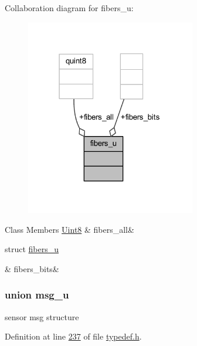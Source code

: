 Collaboration diagram for fibers\+\_\+u\+:
\nopagebreak
\begin{figure}[H]
\begin{center}
\leavevmode
\includegraphics[width=210pt]{d4/d08/a00237}
\end{center}
\end{figure}
\begin{DoxyFields}{Class Members}
\hypertarget{a00001_af25191342a3b02834433f77a6418dd10}{\hyperlink{a00001_a979e3e23b9a449e69ab6a8a83b6042f8}{Uint8}}\label{a00001_af25191342a3b02834433f77a6418dd10}
&
fibers\+\_\+all&
\\
\hline

\hypertarget{a00001_a5c568f743c1dd5e4726460084ca04f6a}{struct \hyperlink{a00001_d1/d6e/a00073}{fibers\+\_\+u}}\label{a00001_a5c568f743c1dd5e4726460084ca04f6a}
&
fibers\+\_\+bits&
\\
\hline

\end{DoxyFields}
\label{da/d2a/a00086}
\hypertarget{a00001_da/d2a/a00086}{}
\subsubsection{union msg\+\_\+u}
sensor msg structure 

Definition at line \hyperlink{a00001_source_l00237}{237} of file \hyperlink{a00001_source}{typedef.\+h}.



